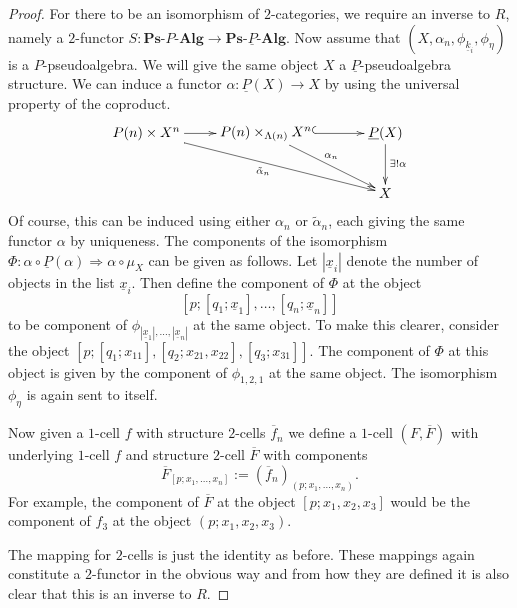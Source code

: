 \documentclass{amsbook} %
\newcommand{\mb}{\mathbf}
\numberwithin{section}{chapter}
\begin{document}
\begin{proof}
For there to be an isomorphism of $2$-categories, we require an inverse to $R$, namely a $2$-functor $S \colon \mb{Ps}\mbox{-}P\mbox{-}\mb{Alg} \rightarrow \mb{Ps}\mbox{-}\underline{P}\mbox{-}\mb{Alg}$. Now assume that $(X, \alpha_n, \phi_{\underline{k}_i}, \phi_\eta)$ is a $P$-pseudoalgebra.  We will give the same object $X$ a $\underline{P}$-pseudoalgebra structure. We can induce a functor $\alpha \colon \underline{P}(X) \rightarrow X$ by using the universal property of the coproduct.
    \[
        \xy
            (-30,0)*+{P(n) \times X^n}="-10";
            (0,0)*+{P(n) \times_{\Lambda(n)} X^n}="00";
            (30,0)*+{\underline{P}(X)}="10";
            (30,-15)*+{X}="11";
            {\ar "-10" ; "00"};
            {\ar^{\alpha_n} "00" ; "11"};
            {\ar@{^{(}->} "00" ; "10"};
            {\ar^{\exists ! \alpha} "10" ; "11"};
            {\ar_{\tilde{\alpha}_n} "-10" ; "11"};
        \endxy
    \]
Of course, this can be induced using either $\alpha_n$ or $\tilde{\alpha}_n$, each giving the same functor $\alpha$ by uniqueness. The components of the isomorphism $\Phi \colon \alpha \circ \underline{P}(\alpha) \Rightarrow \alpha \circ \mu_X$ can be given as follows. Let $|\underline{x}_i|$ denote the number of objects in the list $\underline{x}_i$. Then define the component of $\Phi$ at the object
    \[
        [p;[q_1;\underline{x}_1],\ldots,[q_n;\underline{x}_n]]
    \]
to be component of $\phi_{|\underline{x}_1|, \ldots, |\underline{x}_n|}$ at the same object. To make this clearer, consider the object $[p;[q_1;x_{11}],[q_2;x_{21},x_{22}],[q_3;x_{31}]]$. The component of $\Phi$ at this object is given by the component of $\phi_{1,2,1}$ at the same object. The isomorphism $\phi_\eta$ is again sent to itself.

Now given a $1$-cell $f$ with structure $2$-cells $\overline{f}_n$ we define a $1$-cell $(F,\overline{F})$ with underlying $1$-cell $f$ and structure $2$-cell $\overline{F}$ with components
    \[
        \overline{F}_{[p;x_1, \ldots, x_n]} := \left(\overline{f}_{n}\right)_{(p;x_1,\ldots,x_n)}.
    \]
For example, the component of $\overline{F}$ at the object $[p;x_1,x_2,x_3]$ would be the component of $f_3$ at the object $(p;x_1,x_2,x_3)$.

The mapping for $2$-cells is just the identity as before. These mappings again constitute a $2$-functor in the obvious way and from how they are defined it is also clear that this is an inverse to $R$.
\end{proof}
\end{document}
